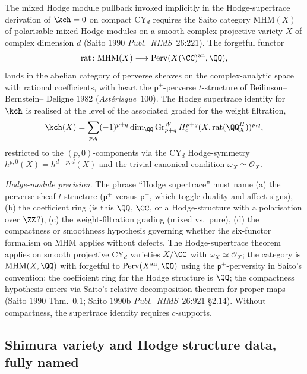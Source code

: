 \begin{theorem}
\label{wn:thm:third-pass-perverse-saito}

The mixed Hodge module pullback invoked implicitly in the
Hodge-supertrace derivation of $\kch = 0$ on compact CY$_d$ requires
the Saito category $\mathrm{MHM}(X)$ of polarisable mixed Hodge
modules on a smooth complex projective variety $X$ of complex
dimension $d$ (Saito $1990$ \emph{Publ.~RIMS}~$26$:$221$). The
forgetful functor
\[
\mathrm{rat}\colon \mathrm{MHM}(X) \longrightarrow
\mathrm{Perv}(X(\CC)^{\mathrm{an}}, \QQ),
\]
lands in the abelian category of perverse sheaves on the
complex-analytic space with rational coefficients, with heart the
$\mathsf{p}^{+}$-perverse $t$-structure of Beilinson--Bernstein--
Deligne $1982$ (\emph{Ast\'erisque}~$100$). The Hodge supertrace
identity for $\kch$ is realised at the level of the associated graded
for the weight filtration,
\[
\kch(X) = \sum_{p, q} (-1)^{p + q}\,
\mathrm{dim}_{\QQ}\, \mathrm{Gr}^W_{p+q}\,
H^{p + q}_{c}(X, \mathrm{rat}(\QQ_X^H))^{p, q},
\]
restricted to the $(p, 0)$-components via the CY$_d$ Hodge-symmetry
$h^{p, 0}(X) = h^{d - p, d}(X)$
and the trivial-canonical condition $\omega_X \simeq \mathcal{O}_X$.

\emph{Hodge-module precision.} The phrase ``Hodge supertrace'' must
name (a) the perverse-sheaf
$t$-structure ($\mathsf{p}^{+}$ versus $\mathsf{p}^{-}$, which toggle
duality and affect signs), (b) the coefficient ring (is this $\QQ$,
$\CC$, or a Hodge-structure with a polarisation over $\ZZ$?),
(c) the weight-filtration grading (mixed vs.\ pure), (d) the
compactness or smoothness hypothesis governing whether the six-functor
formalism on $\mathrm{MHM}$ applies without defects.  The
Hodge-supertrace theorem applies on smooth projective CY$_d$ varieties
$X/\CC$ with $\omega_X \simeq \mathcal{O}_X$; the category is
$\mathrm{MHM}(X, \QQ)$ with forgetful to $\mathrm{Perv}(X^{\mathrm{an}},
\QQ)$ using the $\mathsf{p}^{+}$-perversity in Saito's convention;
the coefficient ring for the Hodge structure is $\QQ$; the
compactness hypothesis enters via Saito's relative decomposition
theorem for proper maps (Saito $1990$ Thm.~$0.1$; Saito $1990$b
\emph{Publ.~RIMS}~$26$:$921$ \S$2.14$). Without compactness, the
supertrace identity requires $c$-supports.
\end{theorem}

\subsection{Shimura variety and Hodge structure data, fully named}
\label{wn:subsec:third-pass-Shimura}

